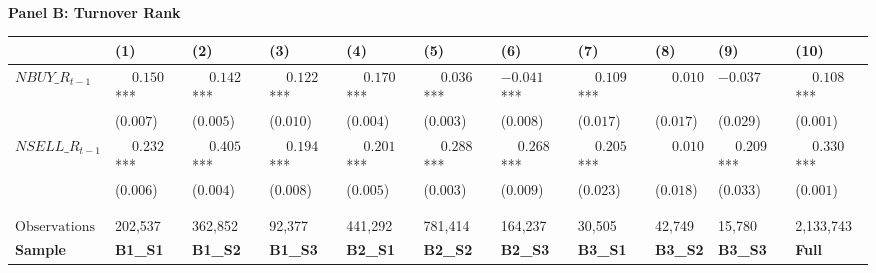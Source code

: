 \begin{landscape}
\begin{table}
\begin{threeparttable}
\phantom{ }\\
\textbf{Panel B: Turnover Rank}
\begin{tabular}[t]{>{\raggedright\arraybackslash}p{2.8cm}>{\raggedright\arraybackslash}p{1.7cm}>{\raggedright\arraybackslash}p{1.7cm}>{\raggedright\arraybackslash}p{1.7cm}>{\raggedright\arraybackslash}p{1.7cm}>{\raggedright\arraybackslash}p{1.7cm}>{\raggedright\arraybackslash}p{1.7cm}>{\raggedright\arraybackslash}p{1.7cm}>{\raggedright\arraybackslash}p{1.7cm}>{\raggedright\arraybackslash}p{1.7cm}>{\raggedright\arraybackslash}p{1.7cm}}
\toprule
 & \phantom{-}(1) & \phantom{-}(2) & \phantom{-}(3) & \phantom{-}(4) & \phantom{-}(5) & \phantom{-}(6) & \phantom{-}(7) & \phantom{-}(8) & \phantom{-}(9) & \phantom{-}(10)\\
\midrule
$NBUY\_R_{t-1}$ & $\phantom{-}0.150$*** & $\phantom{-}0.142$*** & $\phantom{-}0.122$*** & $\phantom{-}0.170$*** & $\phantom{-}0.036$*** & $-0.041$*** & $\phantom{-}0.109$*** & $\phantom{-}0.010$ & $-0.037$ & $\phantom{-}0.108$***\\
 & (\phantom{-}$0.007$) & (\phantom{-}$0.005$) & (\phantom{-}$0.010$) & (\phantom{-}$0.004$) & (\phantom{-}$0.003$) & (\phantom{-}$0.008$) & (\phantom{-}$0.017$) & (\phantom{-}$0.017$) & (\phantom{-}$0.029$) & (\phantom{-}$0.001$)\\
\addlinespace
$NSELL\_R_{t-1}$ & $\phantom{-}0.232$*** & $\phantom{-}0.405$*** & $\phantom{-}0.194$*** & $\phantom{-}0.201$*** & $\phantom{-}0.288$*** & $\phantom{-}0.268$*** & $\phantom{-}0.205$*** & $\phantom{-}0.010$ & $\phantom{-}0.209$*** & $\phantom{-}0.330$***\\
 & (\phantom{-}$0.006$) & (\phantom{-}$0.004$) & (\phantom{-}$0.008$) & (\phantom{-}$0.005$) & (\phantom{-}$0.003$) & (\phantom{-}$0.009$) & (\phantom{-}$0.023$) & (\phantom{-}$0.018$) & (\phantom{-}$0.033$) & (\phantom{-}$0.001$)\\
 &  &  &  &  &  &  &  &  &  \vphantom{1} & \\
\midrule
 &  &  &  &  &  &  &  &  &  & \\
$\textrm{Observations}$ & {\phantom{-}202,537} & {\phantom{-}362,852} & {\phantom{-}92,377} & {\phantom{-}441,292} & {\phantom{-}781,414} & {\phantom{-}164,237} & {\phantom{-}30,505} & {\phantom{-}42,749} & {\phantom{-}15,780} & {\phantom{-}2,133,743}\\
\textbf{Sample} & \textbf{B1\_S1} & \textbf{B1\_S2} & \textbf{B1\_S3} & \textbf{B2\_S1} & \textbf{B2\_S2} & \textbf{B2\_S3} & \textbf{B3\_S1} & \textbf{B3\_S2} & \textbf{B3\_S3} & \textbf{Full}\\
\bottomrule
\end{tabular}
\begin{tablenotes}
\item 
\end{tablenotes}
\end{threeparttable}





\end{table}
\end{landscape}
